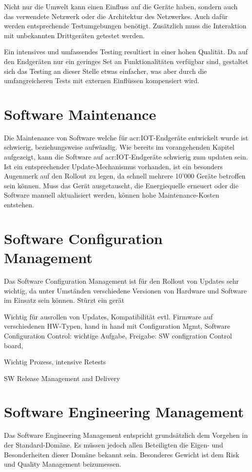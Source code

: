 Nicht nur die Umwelt kann einen Einfluss auf die Geräte haben, sondern auch das verwendete Netzwerk oder die Architektur des Netzwerkes. Auch dafür werden entsprechende Testumgebungen benötigt. Zusätzlich muss die Interaktion mit unbekannten Drittgeräten getestet werden.

Ein intensives und umfassendes Testing resultiert in einer hohen Qualität. Da auf den Endgeräten nur ein geringes Set an Funktionalitäten verfügbar sind, gestaltet sich das Testing an dieser Stelle etwas einfacher, was aber durch die umfangreicheren Tests mit externen Einflüssen kompensiert wird.



\section{Software Maintenance}
Die Maintenance von Software welche für \gls{acr:IOT}-Endgeräte entwickelt wurde ist schwierig, beziehungsweise aufwändig. Wie bereits im vorangehenden Kapitel aufgezeigt, kann die Software auf \gls{acr:IOT}-Endgeräte schwierig zum updaten sein. Ist ein entsprechender Update-Mechanismus vorhanden, ist ein besonders Augenmerk auf den Rollout zu legen, da schnell mehrere 10'000 Geräte betroffen sein können. Muss das Gerät ausgetauscht, die Energiequelle erneuert oder die Software manuell aktualisiert werden, können hohe Maintenance-Kosten entstehen. 


\section{Software Configuration Management}
Das Software Configuration Management ist für den Rollout von Updates sehr wichtig, da unter Umständen verschiedene Versionen von Hardware und Software im Einsatz sein können. Stürzt ein gerät


Wichtig für ausrollen von Updates, Kompatibilität evtl. Firmware auf verschiedenen HW-Typen, hand in hand mit Configuration Mgmt, Software Configuration Control: wichtige Aufgabe, Freigabe: SW configration Control board, 

Wichtig Prozess, intensive Retests

SW Release Management and Delivery



\section{Software Engineering Management}
Das Software Engineering Management entspricht grundsätzlich dem Vorgehen in der Standard-Domäne. Es müssen jedoch allen Beteiligten die Eigen- und Besonderheiten dieser Domäne bekannt sein. Besonderes Gewicht ist dem Risk und Quality Management beizumessen.



